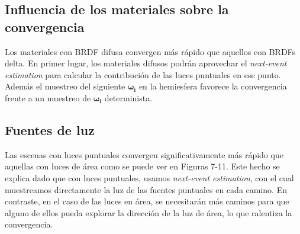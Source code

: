 \documentclass{article}
\begin{document}
\subsection{Influencia de los materiales sobre la convergencia}

Los materiales con BRDF difusa convergen más rápido que aquellos con BRDFs
delta. En primer lugar, los materiales difusos podrán aprovechar el
\textit{next-event estimation} para calcular la contribución de las luces
puntuales en ese punto. Además el muestreo del siguiente \(\mathbf{\omega_{i}}\)
en la hemiesfera favorece la convergencia frente a un muestreo de
\(\mathbf{\omega_{i}}\) determinista.

\subsection{Fuentes de luz}
Las escenas con luces puntuales convergen significativamente más rápido que
aquellas con luces de área como se puede ver en Figuras 7-11. Este hecho se
explica dado que con luces puntuales, usamos \textit{next-event estimation}, con el cual
muestreamos directamente la luz de las fuentes puntuales en cada camino. En
contraste, en el caso de las luces en área, se necesitarán más caminos para que
alguno de ellos pueda explorar la dirección de la luz de área, lo que ralentiza
la convergencia.
\end{document}
